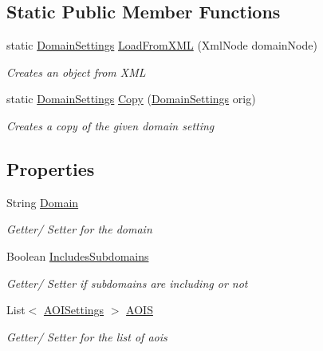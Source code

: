 \subsection*{Static Public Member Functions}
\begin{DoxyCompactItemize}
\item 
static \hyperlink{class_web_analyzer_1_1_models_1_1_settings_model_1_1_domain_settings}{Domain\+Settings} \hyperlink{class_web_analyzer_1_1_models_1_1_settings_model_1_1_domain_settings_aadf710ba6a63d9fa929c8994fb2ebb12}{Load\+From\+X\+M\+L} (Xml\+Node domain\+Node)
\begin{DoxyCompactList}\small\item\em Creates an object from X\+M\+L \end{DoxyCompactList}\item 
static \hyperlink{class_web_analyzer_1_1_models_1_1_settings_model_1_1_domain_settings}{Domain\+Settings} \hyperlink{class_web_analyzer_1_1_models_1_1_settings_model_1_1_domain_settings_a1640b4ee95916081bf83ba1802c74c07}{Copy} (\hyperlink{class_web_analyzer_1_1_models_1_1_settings_model_1_1_domain_settings}{Domain\+Settings} orig)
\begin{DoxyCompactList}\small\item\em Creates a copy of the given domain setting \end{DoxyCompactList}\end{DoxyCompactItemize}
\subsection*{Properties}
\begin{DoxyCompactItemize}
\item 
String \hyperlink{class_web_analyzer_1_1_models_1_1_settings_model_1_1_domain_settings_ad85a389026a0f62a909f96456ac0cc80}{Domain}
\begin{DoxyCompactList}\small\item\em Getter/ Setter for the domain \end{DoxyCompactList}\item 
Boolean \hyperlink{class_web_analyzer_1_1_models_1_1_settings_model_1_1_domain_settings_a55ea049e39a701dd4664daa1a53b1a92}{Includes\+Subdomains}
\begin{DoxyCompactList}\small\item\em Getter/ Setter if subdomains are including or not \end{DoxyCompactList}\item 
List$<$ \hyperlink{class_web_analyzer_1_1_models_1_1_settings_model_1_1_a_o_i_settings}{A\+O\+I\+Settings} $>$ \hyperlink{class_web_analyzer_1_1_models_1_1_settings_model_1_1_domain_settings_a70194a26a56aee579702914bdd7e5963}{A\+O\+I\+S}
\begin{DoxyCompactList}\small\item\em Getter/ Setter for the list of aois \end{DoxyCompactList}\end{DoxyCompactItemize}

